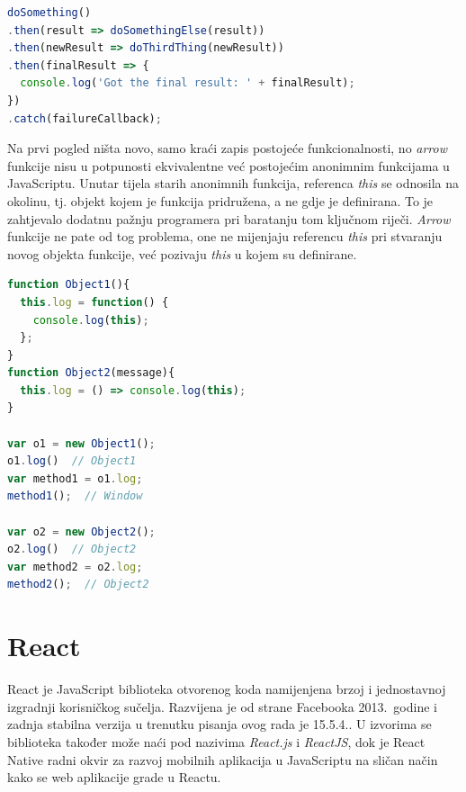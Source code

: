\documentclass[times, utf8, zavrsni, numeric]{fer}
\newcommand{\razmakp}{\vspace{18pt}}
\newcommand{\razmaks}{\vspace{10pt}}
\begin{document}
\razmakp
\begin{lstlisting}[language=JavaScript, caption={Kod iz isječka \ref{lst:callback_vs_promises} napisan pomoću \emph{arrow} funkcija}, label={lst:arrow_promises}]
doSomething()
.then(result => doSomethingElse(result))
.then(newResult => doThirdThing(newResult))
.then(finalResult => {
  console.log('Got the final result: ' + finalResult);
})
.catch(failureCallback);
\end{lstlisting}
\razmaks

Na prvi pogled ništa novo, samo kraći zapis postojeće funkcionalnosti, no \emph{arrow} funkcije nisu u potpunosti ekvivalentne već postojećim anonimnim funkcijama u JavaScriptu.
Unutar tijela starih anonimnih funkcija, referenca \emph{this} se odnosila na okolinu, tj. objekt kojem je funkcija pridružena, a ne gdje je definirana.
To je zahtjevalo dodatnu pažnju programera pri baratanju tom ključnom riječi.
\emph{Arrow} funkcije ne pate od tog problema, one ne mijenjaju referencu \emph{this} pri stvaranju novog objekta funkcije, već pozivaju \emph{this} u kojem su definirane\citep{MDNArrowFunc}.

\razmakp

\razmakp
\begin{lstlisting}[language=JavaScript, caption={Ponašanje ključne riječi \emph{this} u obe verzije anonimnih funkcija}]
function Object1(){
  this.log = function() {
    console.log(this);
  };
}
function Object2(message){
  this.log = () => console.log(this);
}

var o1 = new Object1();
o1.log()  // Object1
var method1 = o1.log;
method1();  // Window

var o2 = new Object2();
o2.log()  // Object2
var method2 = o2.log;
method2();  // Object2
\end{lstlisting}
\razmaks

\newpage


\section{React} \label{sec:react}

React je JavaScript biblioteka otvorenog koda namijenjena brzoj i jednostavnoj izgradnji korisničkog sučelja. Razvijena je od strane Facebooka 2013.\ godine i zadnja stabilna verzija u trenutku pisanja ovog rada je 15.5.4.\citep{reactWiki}.
U izvorima se biblioteka također može naći pod nazivima \emph{React.js} i \emph{ReactJS}, dok je React Native radni okvir za razvoj mobilnih aplikacija u JavaScriptu na sličan način kako se web aplikacije grade u Reactu.
\end{document}
